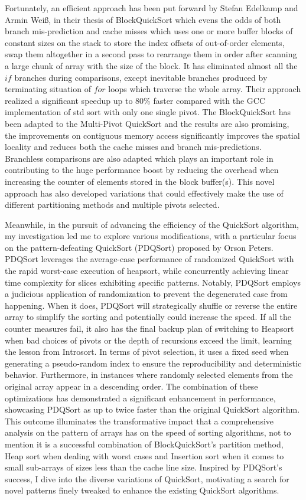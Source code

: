 \documentclass[a4paper,oneside,12pt]{book}
\begin{document}
Fortunately, an efficient approach has been put forward by Stefan Edelkamp and Armin Weiß,
in their thesis of BlockQuickSort \cite{BlockQuickSort}
which evens the odds of both branch mis-prediction and cache misses which uses one or more buffer blocks of constant sizes on the stack
to store the index offsets of out-of-order elements, swap them altogether in a second pass to rearrange them in order
after scanning a large chunk of array with the size of the block.
It has eliminated almost all the $if$ branches during comparisons, except inevitable branches produced by terminating situation of $for$ loops which traverse the whole array.
Their approach realized a significant speedup up to 80\% faster compared with the GCC implementation of std sort
with only one single pivot. The BlockQuickSort has been adapted to the Multi-Pivot QuickSort and the results are also promising,
the improvements on contiguous memory access significantly improves the spatial locality and reduces both the cache misses and branch mis-predictions.
Branchless comparisons are also adapted which plays an important role in contributing to the huge performance boost by reducing the overhead
when increasing the counter of elements stored in the block buffer(s).
This novel approach has also developed variations that could effectively make the use of different partitioning methods and multiple pivots selected. 

Meanwhile, in the pursuit of advancing the efficiency of the QuickSort algorithm,
my investigation led me to explore various modifications, 
with a particular focus on the pattern-defeating QuickSort (PDQSort) proposed by Orson Peters. 
PDQSort leverages the average-case performance of randomized QuickSort with the rapid worst-case execution of heapsort, 
while concurrently achieving linear time complexity for slices exhibiting specific patterns. 
Notably, PDQSort employs a judicious application of randomization to prevent the degenerated case from happening.
When it does, PDQSort will strategically shuffle or reverse the entire array to simplify the sorting and potentially could increase the speed.
If all the counter measures fail, it also has the final backup plan of switching to Heapsort when bad choices of pivots or the depth of recursions exceed the limit,
learning the lesson from Introsort. 
In terms of pivot selection, it uses a fixed seed when generating a pseudo-random index to ensure the reproducibility and deterministic behavior.
Furthermore, in instances where randomly selected elements from the original array appear in a descending order.
The combination of these optimizations has demonstrated a significant enhancement in performance, showcasing PDQSort as up to twice faster than the original QuickSort algorithm. 
This outcome illuminates the transformative impact that a comprehensive analysis on the pattern of arrays has on the speed of sorting algorithms,
not to mention it is a successful combination of BlockQuickSort's partition method,
Heap sort when dealing with worst cases and Insertion sort when it comes to small sub-arrays of sizes less than the cache line size. 
Inspired by PDQSort's success, I dive into the diverse variations of QuickSort,
motivating a search for novel patterns finely tweaked to enhance the existing QuickSort algorithms.
\end{document}
